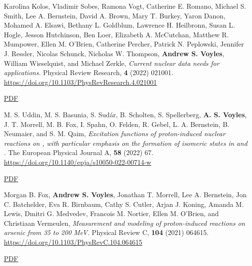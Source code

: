 \begin{bibsection}
\item Karolina Kolos,  Vladimir Sobes,  Ramona Vogt, Catherine E. Romano,  Michael S. Smith,  Lee A. Bernstein, David A. Brown,  Mary T. Burkey,  Yaron Danon,  Mohamed A. Elsawi,  Bethany L. Goldblum, Lawrence H. Heilbronn,  Susan L. Hogle,  Jesson Hutchinson,  Ben Loer,  Elizabeth A. McCutchan, Matthew R. Mumpower,  Ellen M. O’Brien,  Catherine Percher,  Patrick N. Peplowski,  Jennifer J. Ressler, Nicolas Schunck,  Nicholas W. Thompson,  \textbf{Andrew S. Voyles},  William Wieselquist,  and Michael Zerkle, \emph{Current nuclear data needs for applications.} Physical Review Research, \textbf{4} (2022) 021001. \url{https://doi.org/10.1103/PhysRevResearch.4.021001} 

\ifshort \vspace{0.1cm} \href{https://avoyles.github.io/papers/Kolos2022_WANDA.pdf}{\underline{PDF}} \else  \fi 

\item M. S. Uddin, M. S. Basunia, S. Sudár, B. Scholten, S. Spellerberg, \textbf{A. S. Voyles}, J. T. Morrell, M. B. Fox, I. Spahn, O. Felden, R. Gebel, L. A. Bernstein, B. Neumaier, and S. M. Qaim, \emph{Excitation functions of proton-induced nuclear reactions on , with particular emphasis on the formation of isomeric states in  and .} The European Physical Journal A, \textbf{58} (2022) 67. \url{https://doi.org/10.1140/epja/s10050-022-00714-w} 

\ifshort \vspace{0.1cm} \href{https://avoyles.github.io/papers/Uddin2022_86Sr.pdf}{\underline{PDF}} \else  \fi 

\item Morgan B. Fox,  \textbf{Andrew S. Voyles}, Jonathan T. Morrell,  Lee A. Bernstein, Jon C. Batchelder, Eva R. Birnbaum,  Cathy S. Cutler,  Arjan J. Koning,  Amanda M. Lewis,  Dmitri G. Medvedev, Francois M. Nortier,  Ellen M. O’Brien,  and Christiaan Vermeulen, \emph{Measurement and modeling of proton-induced reactions on arsenic from 35 to 200 MeV.} Physical Review C, \textbf{104} (2021) 064615. \url{https://doi.org/10.1103/PhysRevC.104.064615} 

\ifshort \vspace{0.1cm} \href{https://avoyles.github.io/papers/Fox2021_As.pdf}{\underline{PDF}} \else  \fi 



\end{bibsection}
